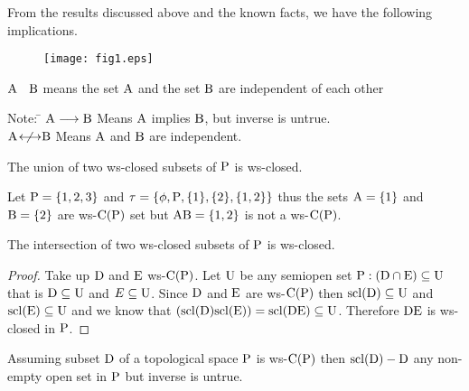 \begin{rem}\label{rem2.2.22}
From the results discussed above and the known facts, we have the following implications.

\begin{figure}[H]
\centering
\texttt{[image: fig1.eps]}
\end{figure}
$\mathrm{A}$ \ $\mathrm{B}$ means the set $\mathrm{A}$ and the set $\mathrm{B}$ are independent of each other

\begin{tabbing}
Note: \= $\mathrm{A}\longrightarrow \mathrm{B}$ Means $\mathrm{A}$ implies $\mathrm{B}$, but inverse is untrue.\\[3pt]
      \> $\mathrm{A}~\not{\kern-8pt\longleftrightarrow} \mathrm{B}$ Means $\mathrm{A}$ and $\mathrm{B}$ are independent.
\end{tabbing}

\end{rem}

\begin{thm}\label{thm2.2.23}
The union of two ws-closed subsets of $\mathrm{P}$ is ws-closed.
\end{thm}

\begin{exm}\label{exm2.2.24}
Let $\mathrm{P} = \{1, 2, 3\}$ and $\tau = \{\phi, \mathrm{P}, \{1\}, \{2\}, \{1, 2\}\}$ thus the sets $\mathrm{A}= \{1\}$ and $\mathrm{B}= \{2\}$ are ws-$\mathrm{C}(\mathrm{P})$ set but $\mathrm{A}\mathrm{B} = \{1,2 \}$ is not a ws-$\mathrm{C}(\mathrm{P})$.
\end{exm}

\begin{thm}\label{thm2.2.25}
The intersection of two ws-closed subsets of $\mathrm{P}$ is ws-closed.
\end{thm}

\begin{proof}
Take up $\mathrm{D}$ and $\mathrm{E}$ ws-$\mathrm{C}(\mathrm{P})$. Let $\mathrm{U}$ be any semiopen set $\mathrm{P} : (\mathrm{D}\cap \mathrm{E})\subseteq \mathrm{U}$ that is $\mathrm{D}\subseteq \mathrm{U}$ and $E\subseteq \mathrm{U}$. Since $\mathrm{D}$ and $\mathrm{E}$ are ws-$\mathrm{C}(\mathrm{P})$ then $\mathrm{scl}(\mathrm{D}) \subseteq  \mathrm{U}$ and $\mathrm{scl}(\mathrm{E})\subseteq \mathrm{U}$ and we know that $(\mathrm{scl}(\mathrm{D})\mathrm{scl}(\mathrm{E})) = \mathrm{scl}(\mathrm{D}\mathrm{E})\subseteq \mathrm{U}$. Therefore $\mathrm{D}\mathrm{E}$ is ws-closed in $\mathrm{P}$.
\end{proof}

\begin{thm}\label{thm2.2.26}
Assuming subset $\mathrm{D}$ of a topological space $\mathrm{P}$ is ws-$\mathrm{C}(\mathrm{P})$ then $\mathrm{scl}(\mathrm{D})-\mathrm{D}$ any non-empty open set in $\mathrm{P}$ but inverse is untrue.
\end{thm}

